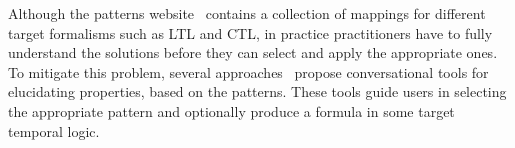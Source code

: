 \documentclass[letter]{llncs}
\begin{document}
Although the patterns website~\cite{PSP} contains a collection
of mappings for different target formalisms such as LTL and CTL, 
in practice practitioners have to fully understand the
solutions before they can select and apply the appropriate ones.
To mitigate this problem, several
approaches~\cite{Smith02propel:an,konrad2005facilitating,Mondragon_prospec}
propose conversational tools for elucidating properties,
based on the patterns. These tools guide users in
selecting the appropriate pattern and optionally produce
a formula in some target temporal logic.  
\end{document}
